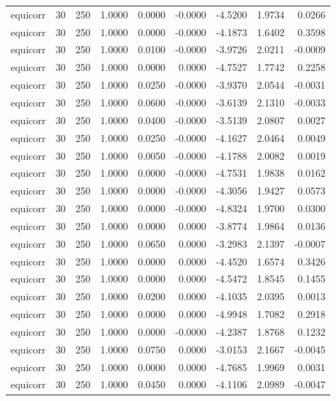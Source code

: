 \begin{tabular}{lrrrrrrrr}
equicorr & 30 & 250 & 1.0000 & 0.0000 & -0.0000 & -4.5200 & 1.9734 & 0.0266 \\
equicorr & 30 & 250 & 1.0000 & 0.0000 & -0.0000 & -4.1873 & 1.6402 & 0.3598 \\
equicorr & 30 & 250 & 1.0000 & 0.0100 & -0.0000 & -3.9726 & 2.0211 & -0.0009 \\
equicorr & 30 & 250 & 1.0000 & 0.0000 & 0.0000 & -4.7527 & 1.7742 & 0.2258 \\
equicorr & 30 & 250 & 1.0000 & 0.0250 & -0.0000 & -3.9370 & 2.0544 & -0.0031 \\
equicorr & 30 & 250 & 1.0000 & 0.0600 & -0.0000 & -3.6139 & 2.1310 & -0.0033 \\
equicorr & 30 & 250 & 1.0000 & 0.0400 & -0.0000 & -3.5139 & 2.0807 & 0.0027 \\
equicorr & 30 & 250 & 1.0000 & 0.0250 & -0.0000 & -4.1627 & 2.0464 & 0.0049 \\
equicorr & 30 & 250 & 1.0000 & 0.0050 & -0.0000 & -4.1788 & 2.0082 & 0.0019 \\
equicorr & 30 & 250 & 1.0000 & 0.0000 & -0.0000 & -4.7531 & 1.9838 & 0.0162 \\
equicorr & 30 & 250 & 1.0000 & 0.0000 & -0.0000 & -4.3056 & 1.9427 & 0.0573 \\
equicorr & 30 & 250 & 1.0000 & 0.0000 & -0.0000 & -4.8324 & 1.9700 & 0.0300 \\
equicorr & 30 & 250 & 1.0000 & 0.0000 & 0.0000 & -3.8774 & 1.9864 & 0.0136 \\
equicorr & 30 & 250 & 1.0000 & 0.0650 & 0.0000 & -3.2983 & 2.1397 & -0.0007 \\
equicorr & 30 & 250 & 1.0000 & 0.0000 & 0.0000 & -4.4520 & 1.6574 & 0.3426 \\
equicorr & 30 & 250 & 1.0000 & 0.0000 & 0.0000 & -4.5472 & 1.8545 & 0.1455 \\
equicorr & 30 & 250 & 1.0000 & 0.0200 & 0.0000 & -4.1035 & 2.0395 & 0.0013 \\
equicorr & 30 & 250 & 1.0000 & 0.0000 & 0.0000 & -4.9948 & 1.7082 & 0.2918 \\
equicorr & 30 & 250 & 1.0000 & 0.0000 & -0.0000 & -4.2387 & 1.8768 & 0.1232 \\
equicorr & 30 & 250 & 1.0000 & 0.0750 & 0.0000 & -3.0153 & 2.1667 & -0.0045 \\
equicorr & 30 & 250 & 1.0000 & 0.0000 & 0.0000 & -4.7685 & 1.9969 & 0.0031 \\
equicorr & 30 & 250 & 1.0000 & 0.0450 & 0.0000 & -4.1106 & 2.0989 & -0.0047 \\

\end{tabular}
